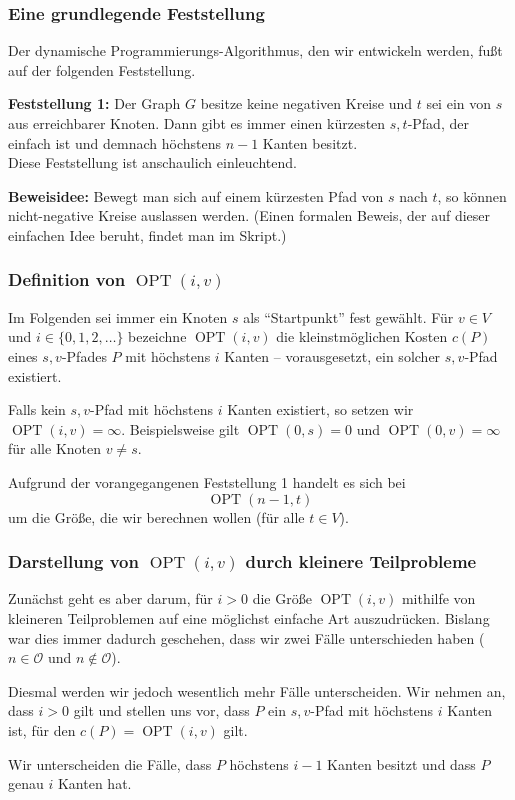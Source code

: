 \documentclass[smaller,xcolor=dvipsnames]{beamer}
\renewcommand{\O}{\mathcal{O}}
\DeclareMathOperator{\opt}{OPT}
\begin{document}
\begin{frame}
\frametitle{Eine grundlegende Feststellung}
 Der dynamische Programmierungs-Algorithmus, den wir entwickeln werden, fußt auf der folgenden Feststellung. \\ \medskip

\textbf{Feststellung 1:} Der Graph $G$ besitze keine negativen Kreise und $t$ sei ein von $s$ aus erreichbarer Knoten. \alert{Dann gibt es immer einen kürzesten $s,t$-Pfad, der einfach ist} und demnach höchstens $n-1$ Kanten besitzt\footnotemark. \\ \medskip
{}
Diese Feststellung ist anschaulich einleuchtend. \\ \medskip

\textbf{Beweisidee:} Bewegt man sich auf einem kürzesten Pfad von $s$ nach $t$, so können nicht-negative Kreise auslassen werden. (Einen formalen Beweis, der auf dieser einfachen Idee beruht, findet man im Skript.)
\end{frame}

\begin{frame}
\frametitle{Definition von $\opt(i,v)$}
 Im Folgenden sei immer ein Knoten $s$ als \enquote{Startpunkt} fest gewählt. Für $v \in V$ und $i \in \bigl\{ 0,1,2,\ldots \bigr\}$ bezeichne $\opt{(i,v)}$ die kleinstmöglichen Kosten $c(P)$ eines $s,v$-Pfades $P$ \alert{mit höchstens $i$ Kanten} -- vorausgesetzt, ein solcher $s,v$-Pfad existiert. \\ \medskip

Falls kein $s,v$-Pfad mit höchstens $i$ Kanten existiert, so setzen wir $\opt{(i,v)}=\infty$. Beispielsweise gilt $\opt{(0,s)}=0$ und $\opt{(0,v)}=\infty$ für alle Knoten $v \neq s$. \\ \medskip

Aufgrund der vorangegangenen Feststellung 1 handelt es sich bei
\[
\opt{(n-1,t)}
\]
um die Größe, die wir berechnen wollen (für alle $t \in V$).
\end{frame}

\begin{frame}
\frametitle{Darstellung von $\opt(i,v)$ durch kleinere Teilprobleme}
 Zunächst geht es aber darum, für $i > 0$ die Größe $\opt{(i,v)}$ mithilfe von kleineren Teilproblemen auf eine möglichst einfache Art auszudrücken. Bislang war dies immer dadurch geschehen, dass wir zwei Fälle unterschieden haben ($n \in \O$ und $n \notin \O$). \\ \medskip
 
 \alert{Diesmal werden wir jedoch wesentlich mehr Fälle unterscheiden}. Wir nehmen an, dass $i > 0$ gilt und stellen uns vor, dass $P$ ein $s,v$-Pfad mit höchstens $i$ Kanten ist, für den $c(P) = \opt{(i,v)}$ gilt. \\ \medskip

Wir unterscheiden die Fälle, dass $P$ höchstens $i-1$ Kanten besitzt und dass $P$ genau $i$ Kanten hat.
\end{frame}
\end{document}
